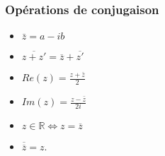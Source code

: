 \documentclass[french]{yLectureNote}
\newcommand{\bz}{\overline{z}}
\begin{document}
\subsubsection{Opérations de conjugaison}
\begin{itemize}
 \item $\displaystyle \bar{z} = a-ib$
 \item $\displaystyle\overline{z+z'} = \overline{z}+\overline{z'}$
 \item $\displaystyle Re(z) = \frac{z+\bar{z}}{2}$
  \item $\displaystyle Im(z) = \frac{z-\bar{z}}{2i}$
  \item $\displaystyle z\in\mathbb{R} \iff z = \bz$
  \item $\displaystyle\overline{\overline{z}} = z$.
\end{itemize}
\end{document}
